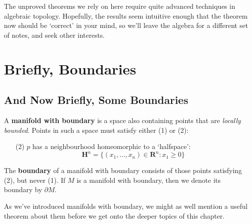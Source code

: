 The unproved theorems we rely on here require quite advanced techniques in algebraic topology. Hopefully, the results seem intuitive enough that the theorem now should be `correct' in your mind, so we'll leave the algebra for a different set of notes, and seek other interests.
















\chapter{Briefly, Boundaries}

\section{And Now Briefly, Some Boundaries}

\begin{definition}
    A {\bf manifold with boundary} is a space also containing points that are {\it locally bounded}. Points in such a space must satisfy either (1) or (2):
    \begin{enumerate}
        \item[(2)] $p$ has a neighbourhood homeomorphic to a `halfspace':
        \[ \mathbf{H}^n = \{ (x_1, \dots, x_n) \in \mathbf{R}^n: x_1 \geq 0 \} \]
    \end{enumerate}
    The {\bf boundary} of a manifold with boundary consists of those points satisfying (2), but never (1). If $M$ is a manifold with boundary, then we denote its boundary by $\partial M$.
\end{definition}

As we've introduced manifolds with boundary, we might as well mention a useful theorem about them before we get onto the deeper topics of this chapter.

